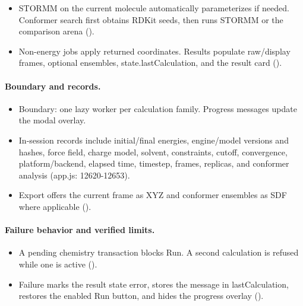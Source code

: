 \documentclass[11pt]{article}
\begin{document}
\begin{small}
\begin{itemize}[leftmargin=*]
\item STORMM on the current molecule automatically parameterizes if needed. Conformer search first obtains RDKit seeds, then runs STORMM or the comparison arena ().

\item Non-energy jobs apply returned coordinates. Results populate raw/display frames, optional ensembles, state.lastCalculation, and the result card ().

\end{itemize}

\paragraph{Boundary and records.}

\begin{itemize}[leftmargin=*]

\item Boundary: one lazy worker per calculation family. Progress messages update the modal overlay.

\item In-session records include initial/final energies, engine/model versions and hashes, force field, charge model, solvent, constraints, cutoff, convergence, platform/backend, elapsed time, timestep, frames, replicas, and conformer analysis (app.js: 12620-12653).

\item Export offers the current frame as XYZ and conformer ensembles as SDF where applicable ().

\end{itemize}

\paragraph{Failure behavior and verified limits.}

\begin{itemize}[leftmargin=*]

\item A pending chemistry transaction blocks Run. A second calculation is refused while one is active ().

\item Failure marks the result state error, stores the message in lastCalculation, restores the enabled Run button, and hides the progress overlay ().


\end{itemize}
\end{small}
\end{document}

